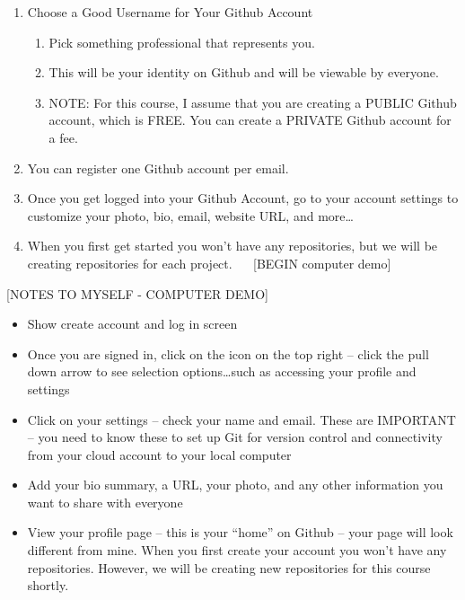 \documentclass[]{book}
\providecommand{\tightlist}{%
  \setlength{\itemsep}{0pt}\setlength{\parskip}{0pt}}
\theoremstyle{definition}
\theoremstyle{definition}
\theoremstyle{definition}
\theoremstyle{remark}
\begin{document}
\begin{enumerate}
\def\labelenumi{\arabic{enumi}.}
\item
  Choose a Good Username for Your Github Account

  \begin{enumerate}
  \def\labelenumii{\alph{enumii}.}
  \tightlist
  \item
    Pick something professional that represents you.
  \item
    This will be your identity on Github and will be viewable by
    everyone.
  \item
    NOTE: For this course, I assume that you are creating a PUBLIC
    Github account, which is FREE. You can create a PRIVATE Github
    account for a fee.
  \end{enumerate}
\item
  You can register one Github account per email.
\item
  Once you get logged into your Github Account, go to your account
  settings to customize your photo, bio, email, website URL, and
  more\ldots{}
\item
  When you first get started you won't have any repositories, but we
  will be creating repositories for each project.   {[}BEGIN computer
  demo{]}
\end{enumerate}

{[}NOTES TO MYSELF - COMPUTER DEMO{]}

\begin{itemize}
\tightlist
\item
  Show create account and log in screen
\item
  Once you are signed in, click on the icon on the top right -- click
  the pull down arrow to see selection options\ldots{}such as accessing
  your profile and settings
\item
  Click on your settings -- check your name and email. These are
  IMPORTANT -- you need to know these to set up Git for version control
  and connectivity from your cloud account to your local computer
\item
  Add your bio summary, a URL, your photo, and any other information you
  want to share with everyone
\item
  View your profile page -- this is your ``home'' on Github -- your page
  will look different from mine. When you first create your account you
  won't have any repositories. However, we will be creating new
  repositories for this course shortly.
\end{itemize}
\end{document}
